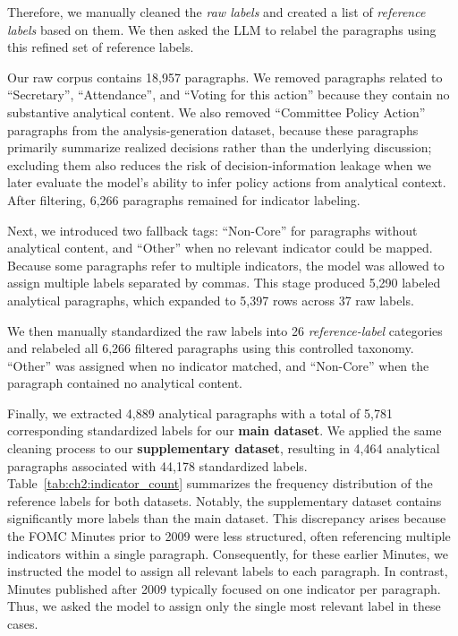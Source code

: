 Therefore, we manually cleaned the \textit{raw labels} and created a list of \textit{reference labels} based on them. We then asked the LLM to relabel the paragraphs using this refined set of reference labels.

Our raw corpus contains 18,957 paragraphs. We removed paragraphs related to ``Secretary'', ``Attendance'', and ``Voting for this action'' because they contain no substantive analytical content. We also removed ``Committee Policy Action'' paragraphs from the analysis-generation dataset, because these paragraphs primarily summarize realized decisions rather than the underlying discussion; excluding them also reduces the risk of decision-information leakage when we later evaluate the model’s ability to infer policy actions from analytical context. After filtering, 6,266 paragraphs remained for indicator labeling.



Next, we introduced two fallback tags: ``Non-Core'' for paragraphs without analytical content, and ``Other'' when no relevant indicator could be mapped. Because some paragraphs refer to multiple indicators, the model was allowed to assign multiple labels separated by commas. This stage produced 5,290 labeled analytical paragraphs, which expanded to 5,397 rows across 37 raw labels.


We then manually standardized the raw labels into 26 \textit{reference-label} categories and relabeled all 6,266 filtered paragraphs using this controlled taxonomy. ``Other'' was assigned when no indicator matched, and ``Non-Core'' when the paragraph contained no analytical content.




Finally, we extracted 4,889 analytical paragraphs with a total of 5,781 corresponding standardized labels for our \textbf{main dataset}. We applied the same cleaning process to our \textbf{supplementary dataset}, resulting in 4,464 analytical paragraphs associated with 44,178 standardized labels. Table~\ref{tab:ch2:indicator_count} summarizes the frequency distribution of the reference labels for both datasets. Notably, the supplementary dataset contains significantly more labels than the main dataset. This discrepancy arises because the FOMC Minutes prior to 2009 were less structured, often referencing multiple indicators within a single paragraph. Consequently, for these earlier Minutes, we instructed the model to assign all relevant labels to each paragraph. In contrast, Minutes published after 2009 typically focused on one indicator per paragraph. Thus, we asked the model to assign only the single most relevant label in these cases.




